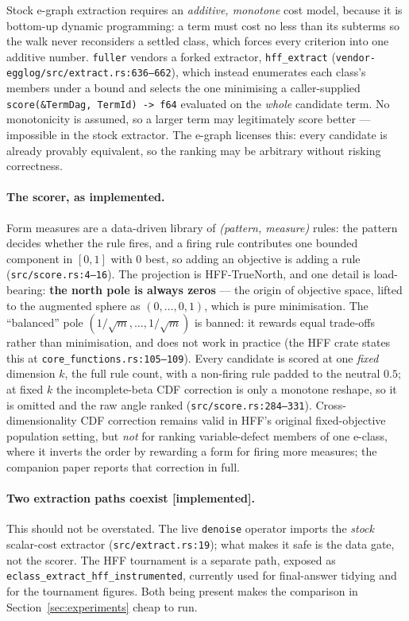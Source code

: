 \documentclass[sigconf]{acmart}
\begin{document}
Stock e-graph extraction requires an \emph{additive, monotone} cost model, because
it is bottom-up dynamic programming: a term must cost no less than its subterms so
the walk never reconsiders a settled class, which forces every criterion into one
additive number. \texttt{fuller} vendors a forked extractor,
\texttt{hff\_extract} (\texttt{vendor-egglog/src/extract.rs:636--662}), which
instead enumerates each class's members under a bound and selects the one
minimising a caller-supplied \texttt{score(\&TermDag, TermId) -> f64} evaluated on
the \emph{whole} candidate term. No monotonicity is assumed, so a larger term may
legitimately score better --- impossible in the stock extractor. The e-graph
licenses this: every candidate is already provably equivalent, so the ranking may
be arbitrary without risking correctness.

\paragraph{The scorer, as implemented.} Form measures are a data-driven library
of \emph{(pattern, measure)} rules: the pattern decides whether the rule fires,
and a firing rule contributes one bounded component in $[0,1]$ with $0$ best, so
adding an objective is adding a rule (\texttt{src/score.rs:4--16}). The
projection is HFF-TrueNorth, and one detail is load-bearing: \textbf{the north
pole is always zeros} --- the origin of objective space, lifted to the augmented
sphere as $(0,\dots,0,1)$, which is pure minimisation. The ``balanced'' pole
$(1/\sqrt{m},\dots,1/\sqrt{m})$ is banned: it rewards equal trade-offs rather
than minimisation, and does not work in practice (the HFF crate states this at
\texttt{core\_functions.rs:105--109}). Every candidate is scored at one
\emph{fixed} dimension $k$, the full rule count, with a non-firing rule padded to
the neutral $0.5$; at fixed $k$ the incomplete-beta CDF correction is only a
monotone reshape, so it is omitted and the raw angle ranked
(\texttt{src/score.rs:284--331}). Cross-dimensionality CDF correction remains
valid in HFF's original fixed-objective population setting, but \emph{not} for
ranking variable-defect members of one e-class, where it inverts the order by
rewarding a form for firing more measures; the companion paper reports that
correction in full.

\paragraph{Two extraction paths coexist [implemented].} This should not be
overstated. The live \texttt{denoise} operator imports the \emph{stock}
scalar-cost extractor (\texttt{src/extract.rs:19}); what makes it safe is the
data gate, not the scorer. The HFF tournament is a separate path, exposed as
\texttt{eclass\_extract\_hff\_instrumented}, currently used for final-answer
tidying and for the tournament figures. Both being present makes the comparison
in Section~\ref{sec:experiments} cheap to run.
\end{document}
